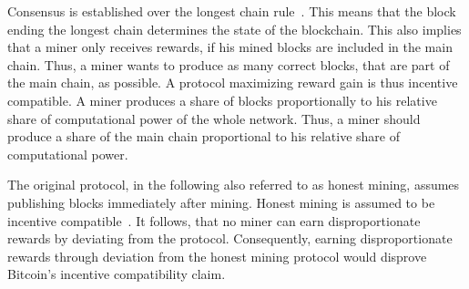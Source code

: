 Consensus is established over the longest chain rule~\cite{1}. This means that the block ending the longest chain determines the state of the blockchain. This also implies that a miner only receives rewards, if his mined blocks are included in the main chain. Thus, a miner wants to produce as many correct blocks, that are part of the main chain, as possible. A protocol maximizing reward gain is thus incentive compatible.
A miner produces a share of blocks proportionally to his relative share of computational power of the whole network. Thus, a miner should produce a share of the main chain proportional to his relative share of computational power.

The original protocol, in the following also referred to as honest mining, assumes publishing blocks immediately after mining. Honest mining is assumed to be incentive compatible~\cite{1}. It follows, that no miner can earn disproportionate rewards by deviating from the protocol.
Consequently, earning disproportionate rewards through deviation from the honest mining protocol would disprove Bitcoin's incentive compatibility claim.

